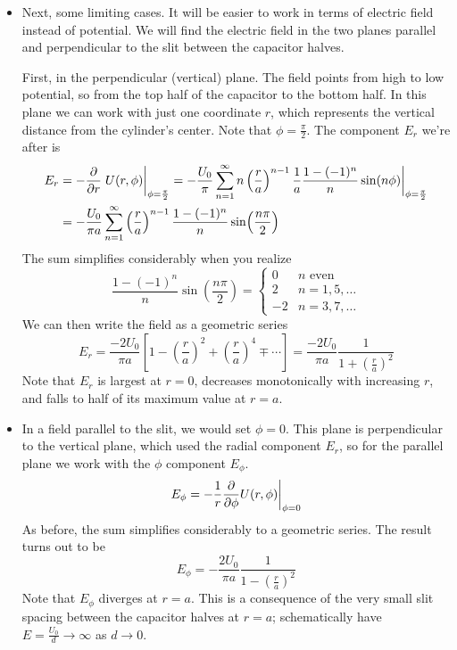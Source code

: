 \documentclass[11pt, a4paper]{article}
\begin{document}
\begin{itemize}
	\item Next, some limiting cases. It will be easier to work in terms of electric field instead of potential. We will find the electric field in the two planes parallel and perpendicular to the slit between the capacitor halves. 
	
	First, in the perpendicular (vertical) plane. The field points from high to low potential, so from the top half of the capacitor to the bottom half. In this plane we can work with just one coordinate $ r $, which represents the vertical distance from the cylinder's center. Note that $ \phi = \frac{\pi}{2} $. The component $ E_{r} $ we're after is
	\begin{align*}
		E_{r} &= - \pdv{r}\eval{U(r, \phi)}_{\phi = \frac{\pi}{2}}  = - \frac{U_{0}}{\pi} \sum_{n = 1}^{\infty} n\left(\frac{r}{a}\right)^{n -1}\frac{1}{a}\frac{1 - (-1)^{n}}{n}\sin(n\phi)\bigg|_{\phi = \frac{\pi}{2}}\\
		&=  -\frac{U_{0}}{\pi a} \sum_{n= 1}^{\infty}\left(\frac{r}{a}\right)^{n-1} \frac{1 - (-1)^{n}}{n}\sin(\frac{n\pi}{2})
	\end{align*}
	The sum simplifies considerably when you realize
	\begin{equation*}
		\frac{1 - (-1)^{n}}{n}\sin(\frac{n\pi}{2}) = 
		\begin{cases}
			0 & n \text{ even} \\
			2 & n = 1, 5,\ldots \\
			-2 & n = 3, 7,\ldots 
		\end{cases}
	\end{equation*}
	We can then write the field as a geometric series
	\begin{equation*}
		E_{r} = \frac{-2U_{0}}{\pi a}\left[1 - \left(\frac{r}{a}\right)^{2} + \left(\frac{r}{a}\right)^{4} \mp \cdots  \right] = \frac{-2U_{0}}{\pi a} \frac{1}{1 + \left(\frac{r}{a}\right)^{2}}
	\end{equation*}
	Note that $ E_{r} $ is largest at $ r = 0 $, decreases monotonically with increasing $ r $, and falls to half of its maximum value at $ r = a $. 
	
	\item In a field parallel to the slit, we would set $ \phi = 0 $. This plane is perpendicular to the vertical plane, which used the radial component $ E_{r} $, so for the parallel plane we work with the $ \phi $ component $ E_{\phi} $. 
	\begin{equation*}
		E_{\phi} = - \frac{1}{r}\pdv{\phi}U(r, \phi) \bigg |_{\phi = 0}
	\end{equation*}
	As before, the sum simplifies considerably to a geometric series. The result turns out to be
	\begin{equation*}
		E_{\phi} = - \frac{2U_{0}}{\pi a}\frac{1}{1 - \left(\frac{r}{a}\right)^{2}}
	\end{equation*}
	Note that $ E_{\phi} $ diverges at $ r = a $. This is a consequence of the very small slit spacing between the capacitor halves at $ r = a $; schematically have $ E = \frac{U_{0}}{d} \to \infty $ as $ d \to 0 $. 
	
\end{itemize}
\end{document}
